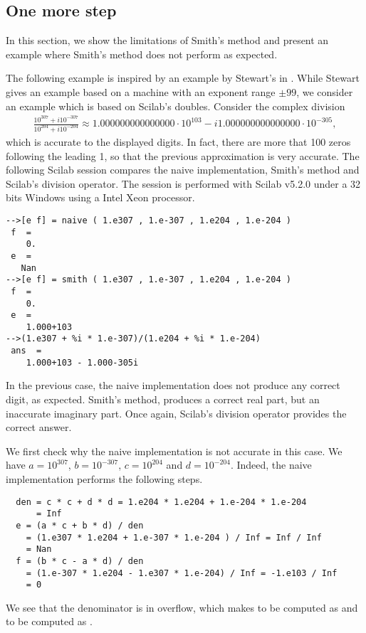\subsection{One more step}

In this section, we show the limitations of Smith's method
and present an example where Smith's method does not perform as 
expected.

The following example is inspired by an example by Stewart's in \cite{214414}. 
While Stewart gives an example based on a machine with an exponent range 
$\pm 99$, we consider an example which is based on Scilab's doubles. 
Consider the complex division
\begin{eqnarray}
\frac{10^{307} +  i 10^{-307}}{10^{204} +   i 10^{-204}} 
\approx 1.000000000000000 \cdot 10^{103} -  i 1.000000000000000 \cdot 10^{-305},
\end{eqnarray}
which is accurate to the displayed digits. In fact, there are more that 100 zeros following the leading 
1, so that the previous approximation is very accurate.
The following Scilab session compares the naive implementation, Smith's method
and Scilab's division operator.
The session is performed with Scilab v5.2.0 under a 32 bits Windows
using a Intel Xeon processor.
\lstset{language=scilabscript}
\begin{lstlisting}
-->[e f] = naive ( 1.e307 , 1.e-307 , 1.e204 , 1.e-204 )
 f  =
    0.  
 e  =
   Nan  
-->[e f] = smith ( 1.e307 , 1.e-307 , 1.e204 , 1.e-204 )
 f  =
    0.  
 e  =
    1.000+103  
-->(1.e307 + %i * 1.e-307)/(1.e204 + %i * 1.e-204)
 ans  =
    1.000+103 - 1.000-305i  
\end{lstlisting}
In the previous case, the naive implementation does not produce any correct digit, as 
expected. Smith's method, produces a correct real part, but an inaccurate imaginary 
part. Once again, Scilab's division operator provides the correct 
answer.

We first check why the naive implementation is not accurate in this case.
We have $a=10^{307}$, $b=10^{-307}$, $c=10^{204}$ and $d=10^{-204}$.
Indeed, the naive implementation performs the following steps.
\begin{lstlisting}
  den = c * c + d * d = 1.e204 * 1.e204 + 1.e-204 * 1.e-204 
      = Inf
  e = (a * c + b * d) / den 
    = (1.e307 * 1.e204 + 1.e-307 * 1.e-204 ) / Inf = Inf / Inf 
    = Nan
  f = (b * c - a * d) / den 
    = (1.e-307 * 1.e204 - 1.e307 * 1.e-204) / Inf = -1.e103 / Inf 
    = 0
\end{lstlisting}
We see that the denominator  is in overflow, which 
makes  to be computed as  and  
to be computed as .

